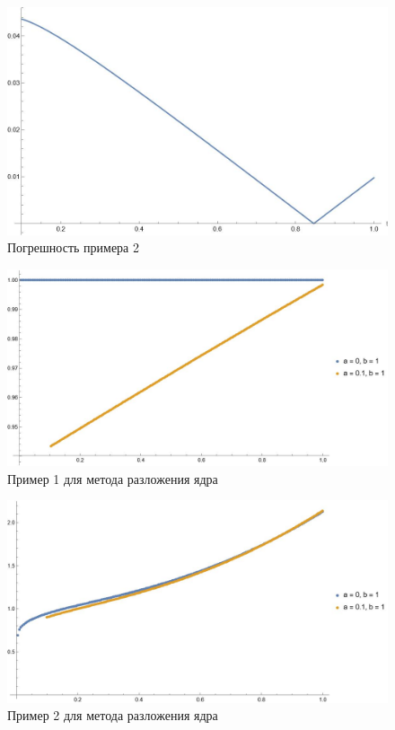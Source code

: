 \documentclass{article}
\begin{document}
			\begin{figure}[H]
        \centering
        \includegraphics[width=\textwidth]{diff_test2.jpg}
        \caption{Погрешность примера 2}
    \end{figure}
	\begin{figure}[H]
        \centering
        \includegraphics[width=\textwidth]{test1_kv.jpg}
        \caption{Пример 1 для метода разложения ядра}
    \end{figure}
	\begin{figure}[H]	
        \centering
        \includegraphics[width=\textwidth]{test2_kv.jpg}
        \caption{Пример 2 для метода разложения ядра}
    \end{figure}
\end{document}
